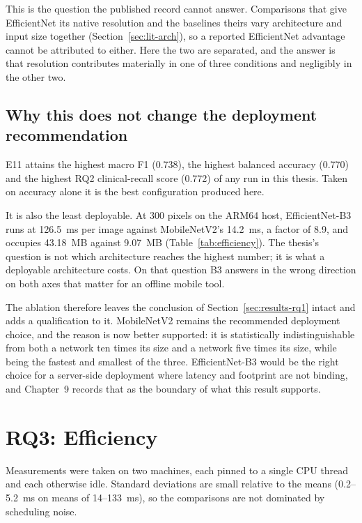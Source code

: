 This is the question the published record cannot answer. Comparisons that give
EfficientNet its native resolution and the baselines theirs vary architecture and input
size together (Section~\ref{sec:lit-arch}), so a reported EfficientNet advantage cannot
be attributed to either. Here the two are separated, and the answer is that resolution
contributes materially in one of three conditions and negligibly in the other two.

\subsection{Why this does not change the deployment recommendation}
\label{sec:b3-deployment}

E11 attains the highest macro F1 (0.738), the highest balanced accuracy (0.770) and the
highest RQ2 clinical-recall score (0.772) of any run in this thesis. Taken on accuracy
alone it is the best configuration produced here.

It is also the least deployable. At 300 pixels on the ARM64 host, EfficientNet-B3 runs at
126.5~ms per image against MobileNetV2's 14.2~ms, a factor of 8.9, and occupies 43.18~MB
against 9.07~MB (Table~\ref{tab:efficiency}). The thesis's question is not which
architecture reaches the highest number; it is what a deployable architecture costs. On
that question B3 answers in the wrong direction on both axes that matter for an offline
mobile tool.

The ablation therefore leaves the conclusion of Section~\ref{sec:results-rq1} intact and
adds a qualification to it. MobileNetV2 remains the recommended deployment choice, and
the reason is now better supported: it is statistically indistinguishable from both a
network ten times its size and a network five times its size, while being the fastest and
smallest of the three. EfficientNet-B3 would be the right choice for a
server-side deployment where latency and footprint are not binding, and Chapter~9 records
that as the boundary of what this result supports.

\section{RQ3: Efficiency}
\label{sec:results-rq3}



Measurements were taken on two machines, each pinned to a single CPU thread and each
otherwise idle. Standard deviations are small relative to the means (0.2--5.2~ms on means
of 14--133~ms), so the comparisons are not dominated by scheduling noise.

